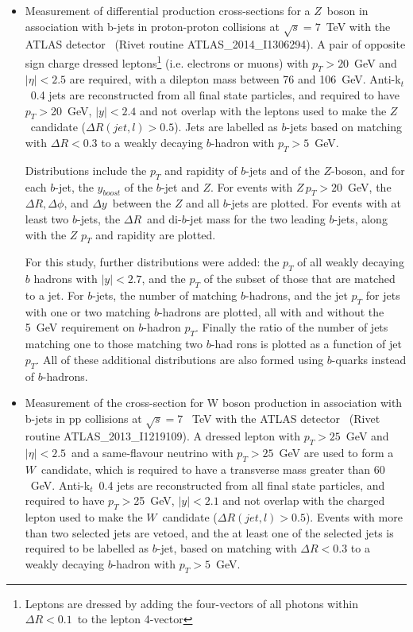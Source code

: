 \documentclass[11pt]{cernrep} \usepackage{graphicx,epsfig} 
\newcommand{\pt}{\ensuremath{p_{T}}\xspace}
\begin{document}
\begin{itemize}
\item Measurement of differential production cross-sections for a $Z$\ boson in association with b-jets in proton-proton
  collisions at $\sqrt{s} = 7$~TeV with the ATLAS detector~\cite{Aad:2014dvb} (Rivet routine 
  ATLAS\_2014\_I1306294). A pair of opposite sign charge dressed leptons\footnote{Leptons are dressed by adding the
    four-vectors of all photons within $\Delta R<0.1$\ to the lepton 4-vector} (i.e. electrons or muons) with
  $\pt>20$~GeV and $|\eta|<2.5$ are required, with a dilepton mass between 76 and 106~GeV. Anti-k$_{t}$\ 0.4 jets are
  reconstructed from all final state particles, and required to have $\pt>$20~GeV, $|y|<2.4$ and not overlap with the
  leptons used to make the $Z$~candidate ($\Delta R(jet, l)> 0.5$). Jets are labelled as $b$-jets based on matching with
  $\Delta  R<0.3$ to a weakly decaying $b$-hadron with $\pt>5$~GeV. 

  Distributions include the \pt and rapidity of $b$-jets and of the $Z$-boson, and for each $b$-jet, the $y_{boost}$ of
  the $b$-jet and $Z$. For events with $Z\, \pt>20$~GeV, the $\Delta R, \Delta\phi$, and $\Delta y$\ between the $Z$ and
  all $b$-jets are plotted. For events with at least two $b$-jets, the $\Delta R$\ and di-$b$-jet mass for the two
  leading $b$-jets, along with the $Z$ \pt and rapidity are plotted. 

  For this study, further distributions were added: the \pt of all weakly decaying $b$ hadrons with $|y|<2.7$, and the
  \pt of the subset of those that are matched to a jet. For $b$-jets, the number of matching $b$-hadrons, and the jet
  \pt for jets with one or two matching $b$-hadrons are plotted, all  with and without the 5~GeV requirement on
  $b$-hadron \pt. Finally the ratio of the number of jets matching one to those matching two $b$-had rons is plotted as
  a function of jet \pt. All of these additional distributions are also formed using $b$-quarks instead of $b$-hadrons.  
  
\item Measurement of the cross-section for W boson production in association with b-jets in pp collisions at $\sqrt{s} =
  7$~ TeV with the ATLAS detector~\cite{Aad:2013vka} (Rivet routine ATLAS\_2013\_I1219109). A dressed lepton with
  $\pt>25$~GeV and $|\eta|<2.5$\ and a same-flavour neutrino with $\pt>25$~GeV are used to form a $W$~candidate, which
  is required to have a transverse mass greater than $60$~GeV. Anti-k$_{t}$\ 0.4 jets are reconstructed from all final
  state particles, and required to have $\pt>$25~GeV, $|y|<2.1$ and not overlap with the charged lepton used to make the
  $W$~candidate ($\Delta R(jet, l)> 0.5$). Events with more than two selected jets are vetoed, and the at least one of
  the selected jets is required to be labelled as $b$-jet, based on matching with $\Delta  R<0.3$ to a weakly decaying
  $b$-hadron with $\pt>5$~GeV. 


\end{itemize}
\end{document}
